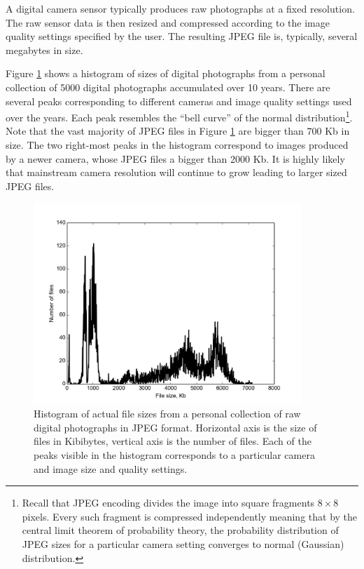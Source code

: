 \documentclass[final,5p,times,twocolumn,authoryear]{elsarticle}
\begin{document}
A digital camera sensor typically produces raw photographs at a fixed resolution. The raw sensor data is then resized and compressed according to the image quality settings specified by the user. The resulting JPEG file is, typically, several megabytes in size.

Figure \ref{fig:jpeg-dist} shows a histogram of sizes of digital photographs from a personal collection of 5000 digital photographs accumulated over 10 years. There are several peaks corresponding to different cameras and image quality settings used over the years. Each peak resembles the ``bell curve'' of the normal distribution\footnote{Recall that JPEG encoding divides the image into square fragments $8 \times 8$ pixels. Every such fragment is compressed independently meaning that by the central limit theorem of probability theory, the probability distribution of JPEG sizes for a particular camera setting converges to normal (Gaussian) distribution.}. Note that the vast majority of JPEG files in Figure \ref{fig:jpeg-dist} are bigger than 700 Kb in size. The two right-most peaks in the histogram correspond to images produced by a newer camera, whose JPEG files a bigger than 2000 Kb. It is highly likely that mainstream camera resolution will continue to grow leading to larger sized JPEG files. 

\begin{figure}
  \centerline{\includegraphics[width=0.9\textwidth]{jpeg-sizes}}
  \caption{Histogram of actual file sizes from a personal collection of raw digital photographs in JPEG format. Horizontal axis is the size of files in Kibibytes, vertical axis is the number of files. Each of the peaks visible in the histogram corresponds to a particular camera and image size and quality settings.}
  \label{fig:jpeg-dist}
\end{figure}
\end{document}
